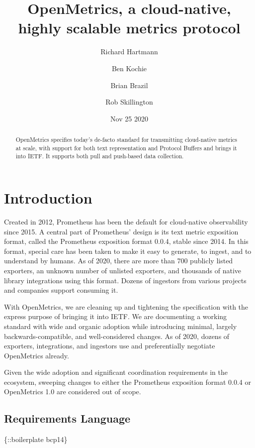 \documentclass[a4paper,12pt,notitlepage,twoside,openright]{article}
\title{OpenMetrics, a cloud-native, highly scalable metrics protocol}
\author{Richard Hartmann \and Ben Kochie \and Brian Brazil \and Rob Skillington}
\date{Nov 25 2020}
\begin{document}
\maketitle

\begin{abstract}

OpenMetrics specifies today's de-facto standard for transmitting
cloud-native metrics at scale, with support for both text representation
and Protocol Buffers and brings it into IETF. It supports both pull and
push-based data collection.

\end{abstract}

\hypertarget{introduction}{%
\section{Introduction}\label{introduction}}

Created in 2012, Prometheus has been the default for cloud-native
observability since 2015. A central part of Prometheus' design is its
text metric exposition format, called the Prometheus exposition format
0.0.4, stable since 2014. In this format, special care has been taken to
make it easy to generate, to ingest, and to understand by humans. As of
2020, there are more than 700 publicly listed exporters, an unknown
number of unlisted exporters, and thousands of native library
integrations using this format. Dozens of ingestors from various
projects and companies support consuming it.

With OpenMetrics, we are cleaning up and tightening the specification
with the express purpose of bringing it into IETF. We are documenting a
working standard with wide and organic adoption while introducing
minimal, largely backwards-compatible, and well-considered changes. As
of 2020, dozens of exporters, integrations, and ingestors use and
preferentially negotiate OpenMetrics already.

Given the wide adoption and significant coordination requirements in the
ecosystem, sweeping changes to either the Prometheus exposition format
0.0.4 or OpenMetrics 1.0 are considered out of scope.

\hypertarget{requirements-language}{%
\subsection{Requirements Language}\label{requirements-language}}

\{::boilerplate bcp14\}
\end{document}
